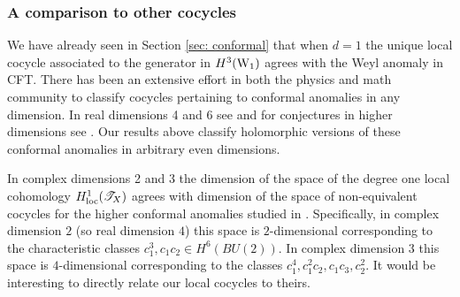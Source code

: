 \documentclass[10pt]{amsart}
\begin{document}

\subsubsection{A comparison to other cocycles}

We have already seen in Section \ref{sec: conformal} that when $d=1$ the unique local cocycle associated to the generator in $H^3({\rm W}_1)$ agrees with the Weyl anomaly in CFT. 
There has been an extensive effort in both the physics and math community to classify cocycles pertaining to conformal anomalies in any dimension. 
In real dimensions 4 and 6 see \cite{Bonora, KMM} and for conjectures in higher dimensions see \cite{DeserSchwimmer}. 
Our results above classify holomorphic versions of these conformal anomalies in arbitrary even dimensions. 

In complex dimensions 2 and 3 the dimension of the space of the degree one local cohomology $H^1_{\rm loc}(\mathscr T_X)$ agrees with dimension of the space of non-equivalent cocycles for the higher conformal anomalies studied in \cite{Bonora, DeserSchwimmer}. 
Specifically, in complex dimension $2$ (so real dimension $4$) this space is $2$-dimensional corresponding to the characteristic classes $c_1^3, c_1c_2 \in H^6(BU(2))$. 
In complex dimension $3$ this space is $4$-dimensional corresponding to the classes $c_1^4, c_1^2c_2, c_1c_3, c_2^2$. 
It would be interesting to directly relate our local cocycles to theirs. 
\end{document}
